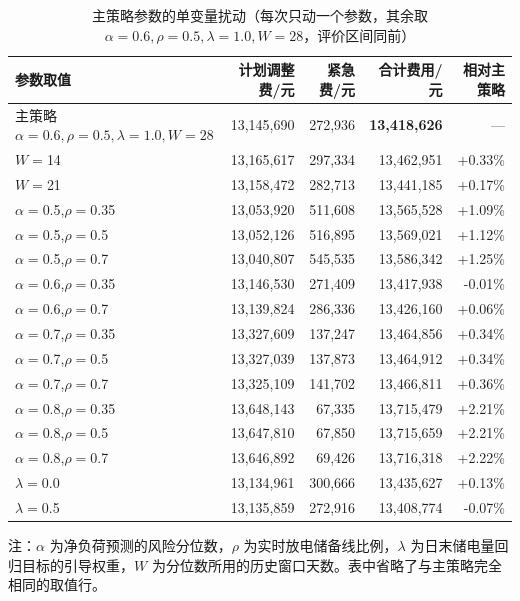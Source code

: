 \begin{table}[htbp]
  \centering
  \caption{主策略参数的单变量扰动（每次只动一个参数，其余取 $\alpha=0.6,\rho=0.5,\lambda=1.0,W=28$，评价区间同前）}
  \label{tab:p3-param}
  \footnotesize
  \begin{tabular}{lrrrr}
    \toprule
    参数取值 & 计划调整费/元 & 紧急费/元 & 合计费用/元 & 相对主策略 \\
    \midrule
    主策略 $\alpha=0.6,\rho=0.5,\lambda=1.0,W=28$ & 13,145,690 & 272,936 & \textbf{13,418,626} & --- \\
    \midrule
    $W=$14 & 13,165,617 & 297,334 & 13,462,951 & +0.33\% \\
    $W=$21 & 13,158,472 & 282,713 & 13,441,185 & +0.17\% \\
    $\alpha=$0.5,\;$\rho=$0.35 & 13,053,920 & 511,608 & 13,565,528 & +1.09\% \\
    $\alpha=$0.5,\;$\rho=$0.5 & 13,052,126 & 516,895 & 13,569,021 & +1.12\% \\
    $\alpha=$0.5,\;$\rho=$0.7 & 13,040,807 & 545,535 & 13,586,342 & +1.25\% \\
    $\alpha=$0.6,\;$\rho=$0.35 & 13,146,530 & 271,409 & 13,417,938 & -0.01\% \\
    $\alpha=$0.6,\;$\rho=$0.7 & 13,139,824 & 286,336 & 13,426,160 & +0.06\% \\
    $\alpha=$0.7,\;$\rho=$0.35 & 13,327,609 & 137,247 & 13,464,856 & +0.34\% \\
    $\alpha=$0.7,\;$\rho=$0.5 & 13,327,039 & 137,873 & 13,464,912 & +0.34\% \\
    $\alpha=$0.7,\;$\rho=$0.7 & 13,325,109 & 141,702 & 13,466,811 & +0.36\% \\
    $\alpha=$0.8,\;$\rho=$0.35 & 13,648,143 & 67,335 & 13,715,479 & +2.21\% \\
    $\alpha=$0.8,\;$\rho=$0.5 & 13,647,810 & 67,850 & 13,715,659 & +2.21\% \\
    $\alpha=$0.8,\;$\rho=$0.7 & 13,646,892 & 69,426 & 13,716,318 & +2.22\% \\
    $\lambda=$0.0 & 13,134,961 & 300,666 & 13,435,627 & +0.13\% \\
    $\lambda=$0.5 & 13,135,859 & 272,916 & 13,408,774 & -0.07\% \\
    \bottomrule
  \end{tabular}
  \par\vspace{2pt}
  \begin{minipage}{.92\textwidth}\footnotesize
    注：$\alpha$ 为净负荷预测的风险分位数，$\rho$ 为实时放电储备线比例，$\lambda$ 为日末储电量回归目标的引导权重，$W$ 为分位数所用的历史窗口天数。表中省略了与主策略完全相同的取值行。
  \end{minipage}
\end{table}

